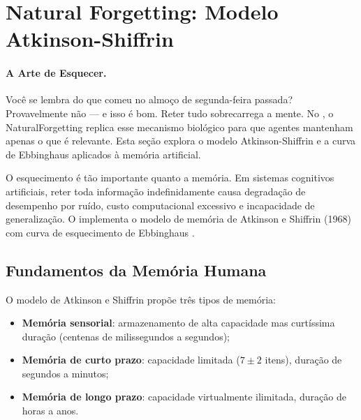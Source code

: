 \section{Natural Forgetting: Modelo Atkinson-Shiffrin}
\label{sec:natural-forgetting}
\nivelphd

\paragraph{A Arte de Esquecer.}
Você se lembra do que comeu no almoço de segunda-feira passada?
Provavelmente não --- e isso é bom. Reter tudo sobrecarrega a
mente. No \opencodeeco{}, o NaturalForgetting replica esse
mecanismo biológico para que agentes mantenham apenas o que é
relevante. Esta seção explora o modelo Atkinson-Shiffrin e a
curva de Ebbinghaus aplicados à memória artificial.

O esquecimento é tão importante quanto a memória. Em sistemas
cognitivos artificiais, reter toda informação indefinidamente causa
degradação de desempenho por ruído, custo computacional excessivo e
incapacidade de generalização. O  implementa
o modelo de memória de Atkinson e Shiffrin (1968) com curva de
esquecimento de Ebbinghaus \cite{atkinson1968human}.

\subsection{Fundamentos da Memória Humana}

O modelo de Atkinson e Shiffrin propõe três tipos de memória:

\begin{itemize}
\item \textbf{Memória sensorial}: armazenamento de alta capacidade mas
curtíssima duração (centenas de milissegundos a segundos);
\item \textbf{Memória de curto prazo}: capacidade limitada
($7 \pm 2$ itens), duração de segundos a minutos;
\item \textbf{Memória de longo prazo}: capacidade virtualmente
ilimitada, duração de horas a anos.
\end{itemize}


